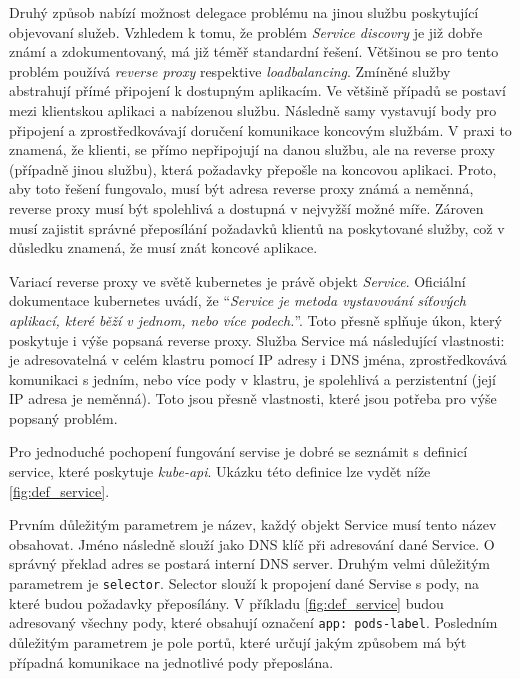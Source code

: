 Druhý způsob nabízí možnost delegace problému na jinou službu poskytující objevovaní služeb. Vzhledem k tomu, že problém \textit{Service discovry} je již dobře známí a zdokumentovaný, má již téměř standardní řešení. Většinou se pro tento problém  používá \textit{reverse proxy} respektive \textit{loadbalancing}. Zmíněné služby abstrahují přímé připojení k dostupným aplikacím. Ve většině případů se postaví mezi klientskou aplikaci a nabízenou službu. Následně samy vystavují body pro připojení a zprostředkovávají doručení komunikace koncovým službám. V praxi to znamená, že klienti, se přímo nepřipojují na danou službu, ale na reverse proxy (případně jinou službu), která požadavky přepošle na koncovou aplikaci. Proto, aby toto řešení fungovalo, musí být adresa reverse proxy známá a neměnná, reverse proxy musí být spolehlivá a dostupná v nejvyžší možné míře. Zároven musí zajistit správné přeposílání požadavků klientů na poskytované služby, což v důsledku znamená, že musí znát koncové aplikace.

Variací reverse proxy ve světě kubernetes je právě objekt \textit{Service}. Oficiální dokumentace kubernetes uvádí, že \enquote{\textit{Service je metoda vystavování síťových aplikací, které běží v jednom, nebo více podech.}}\cite{thekubernetesauthors_2023_service}. Toto přesně splňuje úkon, který poskytuje i výše popsaná reverse proxy. Služba Service má následující vlastnosti: je adresovatelná v celém klastru pomocí IP adresy i DNS jména, zprostředkovává komunikaci s jedním, nebo více pody v klastru, je spolehlivá a perzistentní (její IP adresa je neměnná). Toto jsou přesně vlastnosti, které jsou potřeba pro výše popsaný problém.

Pro jednoduché pochopení fungování servise je dobré se seznámit s definicí service, které poskytuje \textit{kube-api}. Ukázku této definice lze vydět níže \ref{fig:def_service}.


Prvním důležitým parametrem je název, každý objekt Service musí tento název obsahovat. Jméno následně slouží jako DNS klíč při adresování dané Service. O správný překlad adres se postará interní DNS server. Druhým velmi důležitým parametrem je \verb|selector|. Selector slouží k propojení dané Servise s pody, na které budou požadavky přeposílány. V příkladu \ref{fig:def_service} budou adresovaný všechny pody, které obsahují označení \verb|app: pods-label|. Posledním důležitým parametrem je pole portů, které určují jakým způsobem má být případná komunikace na jednotlivé pody přeposlána.

